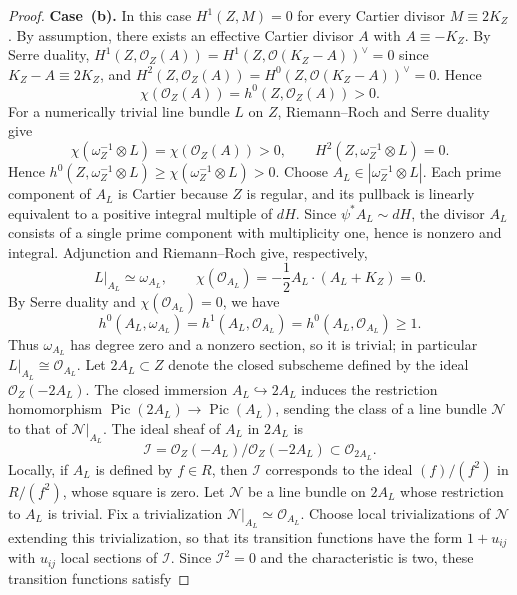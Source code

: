\documentclass[10pt,abstract=true]{scrartcl}
\numberwithin{equation}{section}
\theoremstyle{definition}
\theoremstyle{remark}
\DeclareMathOperator\Pic{Pic}
\begin{document}
\begin{proof}
  \par\smallskip
  \noindent\textbf{Case~\textup{(b)}.}
  In this case $H^1(Z,M)=0$ for every Cartier divisor $M\equiv2K_Z$.
  By assumption, there exists an effective Cartier divisor $A$ with $A\equiv-K_Z$.
  By Serre duality, $H^1(Z,\mathcal O_Z(A))= H^1(Z, \mathcal O(K_Z - A))^\vee = 0$ since $K_Z - A \equiv 2K_Z$, and $H^2(Z,\mathcal O_Z(A))= H^0(Z,\mathcal O(K_Z - A))^\vee = 0$.
  Hence
  \[
    \chi(\mathcal O_Z(A))=h^0(Z,\mathcal O_Z(A))>0.
  \]
  For a numerically trivial line bundle $L$ on $Z$, Riemann--Roch and Serre duality give
  \[
    \chi(\omega_Z^{-1}\otimes L)=\chi(\mathcal O_Z(A))>0,
    \qquad H^2(Z,\omega_Z^{-1}\otimes L)=0.
  \]
  Hence $h^0(Z,\omega_Z^{-1}\otimes L)\geq\chi(\omega_Z^{-1}\otimes L)>0$.
  Choose $A_L\in|\omega_Z^{-1}\otimes L|$.
  Each prime component of $A_L$ is Cartier because $Z$ is regular, and its pullback is linearly equivalent to a positive integral multiple of $dH$.
  Since $\psi^*A_L\sim dH$, the divisor $A_L$ consists of a single prime component with multiplicity one, hence is nonzero and integral.
  Adjunction and Riemann--Roch give, respectively,
  \begin{equation}\label{eq:del-Pezzo-p2-adjunction}
    L|_{A_L}\simeq\omega_{A_L},\qquad
    \chi(\mathcal O_{A_L}) =-\frac12A_L\cdot(A_L+K_Z)=0.
  \end{equation}
  By Serre duality and $\chi(\mathcal O_{A_L}) = 0$, we have
  \[
    h^0(A_L,\omega_{A_L}) = h^1(A_L,\mathcal O_{A_L})
      = h^0(A_L,\mathcal O_{A_L}) \geq 1.
  \]
  Thus $\omega_{A_L}$ has degree zero and a nonzero section, so it is trivial; in particular $L|_{A_L} \cong \mathcal O_{A_L}$.
  Let $2A_L\subset Z$ denote the closed subscheme defined by the ideal $\mathcal O_Z(-2A_L)$.
  The closed immersion $A_L\hookrightarrow 2A_L$ induces the restriction homomorphism $\Pic(2A_L)\to\Pic(A_L)$, sending the class of a line bundle $\mathcal N$ to that of $\mathcal N|_{A_L}$.
  The ideal sheaf of $A_L$ in $2A_L$ is
  \[
    \mathcal I = \mathcal O_Z(-A_L)/\mathcal O_Z(-2A_L)
      \subset \mathcal O_{2A_L}.
  \]
  Locally, if $A_L$ is defined by $f\in R$, then $\mathcal I$ corresponds to the ideal $(f)/(f^2)$ in $R/(f^2)$, whose square is zero.
  Let $\mathcal N$ be a line bundle on $2A_L$ whose restriction to $A_L$ is trivial.
  Fix a trivialization $\mathcal N|_{A_L}\simeq\mathcal O_{A_L}$.
  Choose local trivializations of $\mathcal N$ extending this trivialization, so that its transition functions have the form $1+u_{ij}$ with $u_{ij}$ local sections of $\mathcal I$.
  Since $\mathcal I^2 = 0$ and the characteristic is two, these transition functions satisfy

\end{proof}
\end{document}
